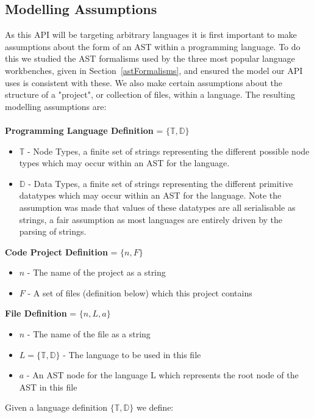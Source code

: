 \documentclass{article}
\begin{document}
\subsection{Modelling Assumptions}\label{apiAssumptions}
As this API will be targeting arbitrary languages it is first important to make assumptions about the form of an AST within a programming language. To do this we studied the AST formalisms used by the three most popular language workbenches, given in Section~\ref{astFormalisms}, and ensured the model our API uses is consistent with these. We also make certain assumptions about the structure of a "project", or collection of files, within a language. The resulting modelling assumptions are:
\\
\\
\textbf{Programming Language Definition} = $\{\mathbb{T},\mathbb{D}\}$ 
\begin{itemize}
\item $\mathbb{T}$ - Node Types, a finite set of strings representing the different possible node types which may occur within an AST for the language.
\item $\mathbb{D}$ - Data Types, a finite set of strings representing the different primitive datatypes which may occur within an AST for the language. Note the assumption was made that values of these datatypes are all serialisable as strings, a fair assumption as most languages are entirely driven by the parsing of strings.
\end{itemize}
%
\textbf{Code Project Definition} = $\{n,F \}$ 
\begin{itemize}
\item $n$ - The name of the project as a string
\item $F$ - A set of files (definition below) which this project contains
\end{itemize}
%
\textbf{File Definition} = $\{n, L, a\}$ 
\begin{itemize}
\item $n$ - The name of the file as a string
\item $L=\{\mathbb{T},\mathbb{D}\}$ - The language to be used in this file
\item $a$ - An AST node for the language L which represents the root node of the AST in this file
\end{itemize}
%
Given a language definition $\{\mathbb{T},\mathbb{D}\}$ we define:\\
\\
\end{document}
